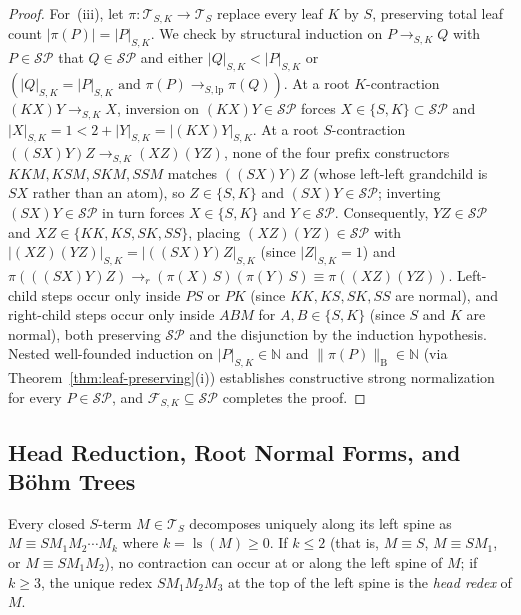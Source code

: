 \documentclass[11pt,reqno]{amsart}
\numberwithin{equation}{section}
\theoremstyle{plain}
\theoremstyle{definition}
\theoremstyle{remark}
\DeclareMathOperator{\ls}{ls}
\newcommand{\TS}{\mathcal{T}_S}
\begin{document}
\begin{proof}
For~(iii), let $\pi \colon \mathcal{T}_{S,K} \to \TS$ replace every leaf $K$ by $S$, preserving total leaf count $|\pi(P)| = |P|_{S,K}$. We check by structural induction on $P \to_{S,K} Q$ with $P \in \mathcal{SP}$ that $Q \in \mathcal{SP}$ and either $|Q|_{S,K} < |P|_{S,K}$ or $(|Q|_{S,K} = |P|_{S,K} \text{ and } \pi(P) \to_{S,\mathrm{lp}} \pi(Q))$. At a root $K$-contraction $(K X) Y \to_{S,K} X$, inversion on $(K X) Y \in \mathcal{SP}$ forces $X \in \{S, K\} \subset \mathcal{SP}$ and $|X|_{S,K} = 1 < 2 + |Y|_{S,K} = |(K X) Y|_{S,K}$. At a root $S$-contraction $((S X) Y) Z \to_{S,K} (X Z)(Y Z)$, none of the four prefix constructors $K K M, K S M, S K M, S S M$ matches $((S X) Y) Z$ (whose left-left grandchild is $S X$ rather than an atom), so $Z \in \{S, K\}$ and $(S X) Y \in \mathcal{SP}$; inverting $(S X) Y \in \mathcal{SP}$ in turn forces $X \in \{S, K\}$ and $Y \in \mathcal{SP}$. Consequently, $Y Z \in \mathcal{SP}$ and $X Z \in \{K K, K S, S K, S S\}$, placing $(X Z)(Y Z) \in \mathcal{SP}$ with $|(X Z)(Y Z)|_{S,K} = |((S X) Y) Z|_{S,K}$ (since $|Z|_{S,K} = 1$) and $\pi(((S X) Y) Z) \to_r (\pi(X)\,S)(\pi(Y)\,S) \equiv \pi((X Z)(Y Z))$. Left-child steps occur only inside $P S$ or $P K$ (since $K K, K S, S K, S S$ are normal), and right-child steps occur only inside $A B M$ for $A, B \in \{S, K\}$ (since $S$ and $K$ are normal), both preserving $\mathcal{SP}$ and the disjunction by the induction hypothesis. Nested well-founded induction on $|P|_{S,K} \in \mathbb{N}$ and $\|\pi(P)\|_{\mathrm{B}} \in \mathbb{N}$ (via Theorem~\ref{thm:leaf-preserving}(i)) establishes constructive strong normalization for every $P \in \mathcal{SP}$, and $\mathcal{F}_{S,K} \subseteq \mathcal{SP}$ completes the proof.
\end{proof}

\subsection{Head Reduction, Root Normal Forms, and B\"ohm Trees}\label{subsec:prelim-bohm}

Every closed $S$-term $M \in \TS$ decomposes uniquely along its left spine as $M \equiv S M_1 M_2 \cdots M_k$ where $k = \ls(M) \ge 0$. If $k \le 2$ (that is, $M \equiv S$, $M \equiv S M_1$, or $M \equiv S M_1 M_2$), no contraction can occur at or along the left spine of $M$; if $k \ge 3$, the unique redex $S M_1 M_2 M_3$ at the top of the left spine is the \emph{head redex} of $M$.
\end{document}
